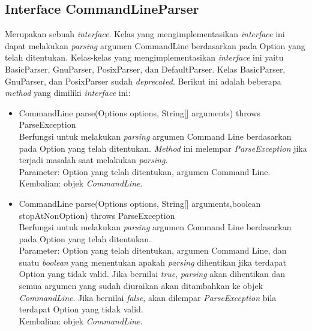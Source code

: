 \subsection{Interface CommandLineParser}
\label{subsec:commandlineparser}
Merupakan sebuah \textit{interface}. Kelas yang mengimplementasikan \textit{interface} ini dapat melakukan \textit{parsing} argumen CommandLine berdasarkan pada Option yang telah ditentukan. Kelas-kelas yang mengimplementasikan \textit{interface} ini yaitu BasicParser, GnuParser, PosixParser, dan DefaultParser. Kelas BasicParser, GnuParser, dan PosixParser sudah \textit{deprecated}. Berikut ini adalah beberapa \textit{method} yang dimiliki \textit{interface} ini: 
\begin{itemize}
\item CommandLine parse(Options options, String[] arguments) throws ParseException\\
Berfungsi untuk melakukan \textit{parsing} argumen Command Line berdasarkan pada Option yang telah ditentukan. \textit{Method} ini melempar \textit{ParseException} jika terjadi masalah saat melakukan \textit{parsing}.\\
Parameter: Option yang telah ditentukan, argumen Command Line.\\
Kembalian: objek \textit{CommandLine}.

\item CommandLine parse(Options options, String[] arguments,boolean stopAtNonOption) throws ParseException\\
Berfungsi untuk melakukan \textit{parsing} argumen Command Line berdasarkan pada Option yang telah ditentukan.\\
Parameter: Option yang telah ditentukan, argumen Command Line, dan suatu \textit{boolean} yang menentukan apakah \textit{parsing} dihentikan jika terdapat Option yang tidak valid. Jika bernilai \textit{true}, \textit{parsing} akan dihentikan dan semua argumen yang sudah diuraikan akan ditambahkan ke objek \textit{CommandLine}. Jika bernilai \textit{false}, akan dilempar \textit{ParseException} bila terdapat Option yang tidak valid.\\
Kembalian: objek \textit{CommandLine}.
\end{itemize}


